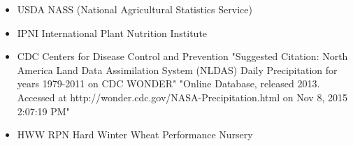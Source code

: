 \documentclass[paperwidth=42in,paperheight=44in]{baposter}
\begin{document}
\begin{poster}
{\begin{itemize}
\item USDA NASS (National Agricultural Statistics Service)
\item IPNI International Plant Nutrition Institute \cite{nuGIS}
\item CDC Centers for Disease Control and Prevention \cite{nldas}
   "Suggested Citation: North America Land Data Assimilation System (NLDAS) Daily Precipitation for years 1979-2011 on CDC WONDER"
   "Online Database, released 2013. Accessed at http://wonder.cdc.gov/NASA-Precipitation.html on Nov 8, 2015 2:07:19 PM"
\item HWW RPN Hard Winter Wheat Performance Nursery 
\end{itemize}
}


\end{poster}
\end{document}
